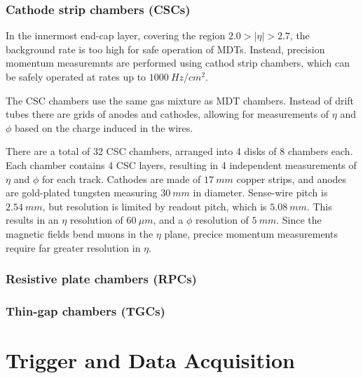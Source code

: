 \subsubsection{Cathode strip chambers (CSCs)}

In the innermost end-cap layer, covering the region $2.0 > |\eta| > 2.7$,
the background rate is too high for safe operation of MDTs.
Instead, precision momentum measuremnts are performed using cathod strip chambers,
which can be safely operated at rates up to $1000~Hz/cm^2$\cite{atlas-detector-2008}.

The CSC chambers use the same gas mixture as MDT chambers.
Instead of drift tubes there are grids of anodes and cathodes, allowing for measurements of $\eta$ and $\phi$ based on
the charge induced in the wires.

There are a total of 32 CSC chambers, arranged into 4 disks of 8 chambers each.
Each chamber contains 4 CSC layers, resulting in 4 independent measurements of $\eta$ and $\phi$ for each track.
Cathodes are made of $17~mm$ copper strips, and anodes are gold-plated tungsten measuring $30~mm$ in diameter.
Sense-wire pitch is $2.54~mm$, but resolution is limited by readout pitch, which is $5.08~mm$.
This results in an $\eta$ resolution of $60~\mu m$, and a $\phi$ resolution of $5~mm$.\cite{muon-2003}
Since the magnetic fields bend muons in the $\eta$ plane, precice momentum measurements require far greater resolution in $\eta$.

\subsubsection{Resistive plate chambers (RPCs)}
\subsubsection{Thin-gap chambers (TGCs)}

\section{Trigger and Data Acquisition}\label{sec:trigger}
